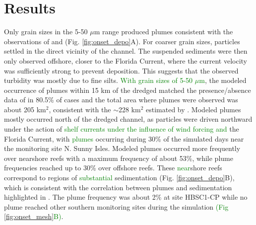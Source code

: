 \documentclass[preprint,12pt,authoryear]{elsarticle}
\newcommand{\modif}[1]{\textcolor{green}{#1}}
\begin{document}
\section{Results}

Only grain sizes in the 5-50 $\mu$m range produced plumes consistent with the observations of \cite{barnes2015sediment} and \cite{cunning2019extensive} (Fig. \ref{fig:onset_depo}A). For coarser grain sizes, particles settled in the direct vicinity of the channel. The suspended sediments were then only observed offshore, closer to the Florida Current, where the current velocity was sufficiently strong to prevent deposition. This suggests that the observed turbidity was mostly due to fine silts. \modif{With grain sizes of 5-50 $\mu$m}, the modeled occurrence of plumes  within 15 km of the dredged matched the presence/absence data of \cite{cunning2019extensive} in 80.5\% of cases and the total area where plumes were observed was about 205 km$^2$, consistent with the $\sim$228 km$^2$ estimated by \cite{barnes2015sediment}. Modeled plumes mostly occurred north of the dredged channel, as particles were driven northward under the action of \modif{shelf currents under the influence of wind forcing and} the Florida Current, with \modif{plumes} occurring during 30\% of the simulated days near the monitoring site N. Sunny Isles. Modeled plumes occurred more frequently over nearshore reefs with a maximum frequency of about 53\%, while plume frequencies reached up to 30\% over offshore reefs. These \modif{near}shore reefs correspond to regions of \modif{substantial} sedimentation (Fig. \ref{fig:onset_depo}B), which is consistent with the correlation between plumes and sedimentation highlighted in \cite{cunning2019extensive}. The plume frequency was about 2\% at site HBSC1-CP while no plume reached other southern monitoring sites during the simulation \modif{(Fig \ref{fig:onset_mesh}B)}. 

\end{document}
